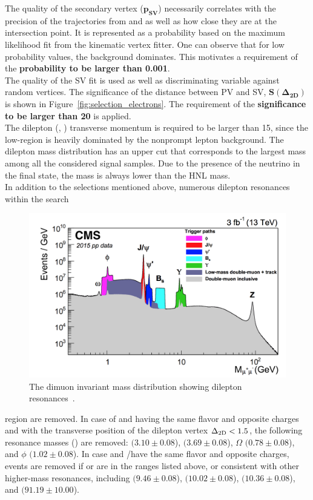 The quality of the secondary vertex ($\boldsymbol{ p_{SV}}$) necessarily correlates with the precision of the trajectories from \ltwo and \lthree as well as how close they are at the intersection point. It is represented as a probability based on the maximum likelihood fit from the kinematic vertex fitter. One can observe that for low probability values, the background dominates. This motivates a requirement of the \textbf{probability to be larger than 0.001}. \\

The quality of the SV fit is used as well as discriminating variable against random vertices. The significance of the distance between PV and SV, $\boldsymbol{ S(\Delta_{2D})}$ is shown in Figure~\ref{fig:selection_electrons}. The requirement of the \textbf{significance to be larger than 20} is applied.\\

The dilepton (\ltwo, \lthree) transverse momentum  is required to be
larger than 15\GeV, since the low-\pt region is heavily dominated by
the nonprompt lepton background.
The dilepton mass \mtwol distribution has an upper cut that
corresponds to the largest mass among all the considered signal
samples. Due to the presence of the neutrino in the final state, the
mass is always lower than the HNL mass.\\

In addition to the selections mentioned above, numerous dilepton
resonances within the search
 \begin{figure}
\centering
\includegraphics[clip,trim=1.2cm 0.1cm 0.8cm 0.3cm, width=.40\textwidth]{Figures/c2/dimuon}
\caption{The dimuon invariant mass distribution showing dilepton resonances~\cite{Sirunyan_2018_muon}.}
\label{fig:c6dimuon}
\end{figure}
 region are removed.
In case of \ltwo and \lthree having the same flavor and opposite
charges and with the transverse position of the dilepton vertex
$\Delta_{\mathrm{2D}}<1.5$\cm, the following resonance masses (\mtwol) are
removed: 
\JPsi $(3.10 \pm 0.08$\GeV), \Pgy $(3.69 \pm 0.08$\GeV), $\Omega$
$(0.78 \pm 0.08$\GeV), and $\phi$ $(1.02 \pm 0.08$\GeV).
In case \lone and \ltwo/\lthree have the same flavor and opposite
charges, events are removed if \mlonetwo or \mlonethree are in the
ranges listed above, or consistent with other higher-mass resonances,
including \PgUa $(9.46 \pm 0.08$\GeV), \PgUb $(10.02 \pm 0.08$\GeV),
\PgUc $(10.36 \pm 0.08$\GeV), and \PZ $(91.19 \pm 10.00$\GeV).


